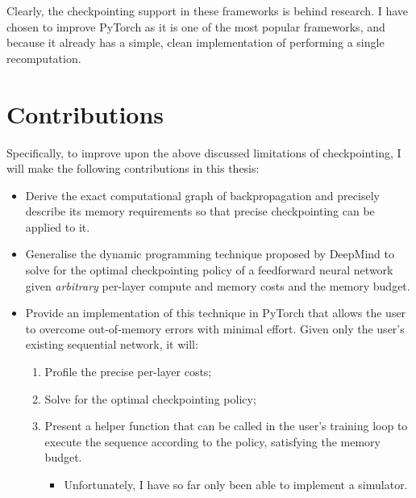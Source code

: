 Clearly, the checkpointing support in these frameworks is behind research. I have chosen to improve PyTorch as it is one of the most popular frameworks, and because it already has a simple, clean implementation of performing a single recomputation.

\section*{Contributions}
Specifically, to improve upon the above discussed limitations of checkpointing, I will make the following contributions in this thesis:
\begin{itemize}[topsep=0pt]
    \item Derive the exact computational graph of backpropagation and precisely describe its memory requirements so that precise checkpointing can be applied to it.
    \item Generalise the dynamic programming technique proposed by DeepMind to solve for the optimal checkpointing policy of a feedforward neural network given \textit{arbitrary} per-layer compute and memory costs and the memory budget.
    \item Provide an implementation of this technique in PyTorch that allows the user to overcome out-of-memory errors with minimal effort. Given only the user's existing sequential network, it will:
    \begin{enumerate}
        \item Profile the precise per-layer costs;
        \item Solve for the optimal checkpointing policy;
        \item Present a helper function that can be called in the user's training loop to execute the sequence according to the policy, satisfying the memory budget.
        \begin{itemize}
            \item Unfortunately, I have so far only been able to implement a simulator.
        \end{itemize}
    \end{enumerate}
\end{itemize}
